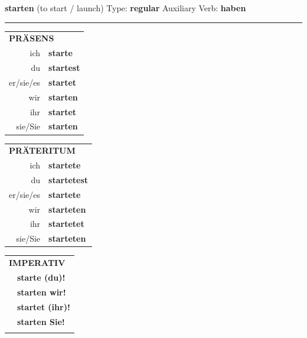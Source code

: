 \documentclass[10pt,a4paper]{revtex4-2}
\begin{document}
\begin{verbbox}
    {\Large \bf starten} (to start / launch) \hfill Type: \textbf{regular} \hfill Auxiliary Verb: \textbf{haben} 
    
     \vspace{5pt}

    \hrule
    
    \vspace{5pt}

  \begin{tabular}{rl}
     \multicolumn{2}{l}{\textbf{PRÄSENS} }\\
    ich & \textbf{starte}\\
    du & \textbf{startest}\\
    er/sie/es & \textbf{startet}\\
    wir & \textbf{starten}\\
    ihr & \textbf{startet}\\
    sie/Sie & \textbf{starten}\\
  \end{tabular}
  \hfill
  \begin{tabular}{rl}
    \multicolumn{2}{l}{\textbf{PRÄTERITUM} }\\
    ich & \textbf{startete}\\
    du & \textbf{startetest}\\
    er/sie/es & \textbf{startete}\\
    wir & \textbf{starteten}\\
    ihr & \textbf{startetet}\\
    sie/Sie & \textbf{starteten}\\
  \end{tabular}
  \hfill
  \begin{tabular}{rl}
     \multicolumn{2}{l}{\textbf{IMPERATIV} }\\
   & \textbf{starte (du)!}\\
   & \textbf{starten wir!}\\
   & \textbf{startet (ihr)!}\\
   & \textbf{starten Sie!}\\
   & \vspace{10pt}
  \end{tabular}

 \vspace{10pt}


\end{verbbox}
\end{document}
